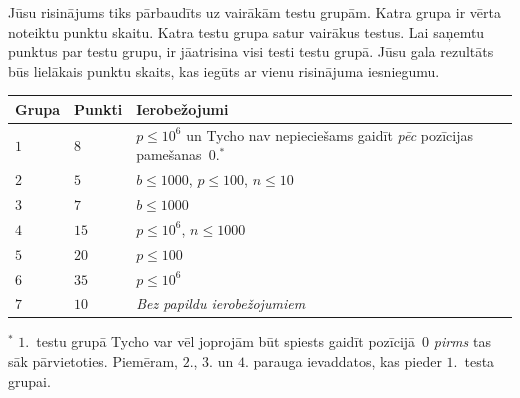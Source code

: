 Jūsu risinājums tiks pārbaudīts uz vairākām testu grupām. Katra grupa ir vērta noteiktu punktu skaitu.
Katra testu grupa satur vairākus testus.
Lai saņemtu punktus par testu grupu, ir jāatrisina visi testi testu grupā.
Jūsu gala rezultāts būs lielākais punktu skaits, kas iegūts ar vienu risinājuma iesniegumu.

\medskip
\begin{tabular}{lll}
  Grupa & Punkti & Ierobežojumi\\\hline
  $1$ & $8$  & $p\leq 10^6$ un Tycho nav nepieciešams gaidīt \emph{pēc} pozīcijas pamešanas~$0$.$^*$ \\ %
  $2$ & $5$  & $b\leq 1000$, $p\leq 100$, $n\leq 10$ \\
  $3$ & $7$  & $b\leq 1000$ \\
  $4$ & $15$ & $p\leq 10^6$, $n\leq 1000$\\
  $5$ & $20$ & $p\leq 100$\\
  $6$ & $35$ & $p\leq 10^6$\\
  $7$ & $10$ & \emph{Bez papildu ierobežojumiem}
\end{tabular}

\medskip
\noindent $^*$ $1$.~testu grupā Tycho var vēl joprojām būt spiests gaidīt pozīcijā~$0$ \emph{pirms} tas sāk pārvietoties. Piemēram, $2$., $3$. un $4$. parauga ievaddatos, kas pieder $1$.~testa grupai.

